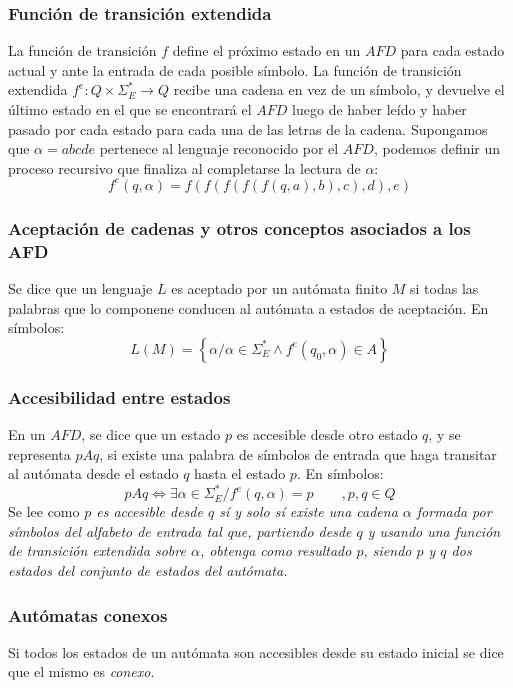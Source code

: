 \documentclass[12pt]{article}
\begin{document}
\subsubsection{Función de transición extendida}
La función de transición $ f $ define el próximo estado en un $ AFD $ para cada estado actual y ante la entrada de cada posible símbolo. La función de transición extendida $ f^{e}:Q\times \Sigma_{E}^{*} \to Q $ recibe una cadena en vez de un símbolo, y devuelve el último estado en el que se encontrará el $ AFD $ luego de haber leído y haber pasado por cada estado para cada una de las letras de la cadena. Supongamos que $ \alpha=abcde $ pertenece al lenguaje reconocido por el $ AFD $, podemos definir un proceso recursivo que finaliza al completarse la lectura de $ \alpha $:
\[
f^{e}(q,\alpha) = f(f(f(f(f(q,a),b),c),d),e)
\]

\subsubsection{Aceptación de cadenas y otros conceptos asociados a los AFD}
Se dice que un lenguaje $ L $ es aceptado por un autómata finito $ M $ si todas las palabras que lo componene conducen al autómata a estados de aceptación. En símbolos:
\[
L(M) = \left\{\alpha / \alpha \in \Sigma_{E}^{*} \land f^{e}(q_{0},\alpha) \in A\right\}
\]

\subsubsection{Accesibilidad entre estados}
En un $ AFD $, se dice que un estado $ p $ es accesible desde otro estado $ q $, y se representa $ pAq $, si existe una palabra de símbolos de entrada que haga transitar al autómata desde el estado $ q $ hasta el estado $ p $. En símbolos:
\[
pAq  \iff  \exists \alpha \in \Sigma_{E}^{*} / f^{e}(q,\alpha)=p\qquad ,p,q \in Q
\]
Se lee como \textit{$ p $ es accesible desde $ q $ sí y solo sí existe una cadena $ \alpha $ formada por símbolos del alfabeto de entrada tal que, partiendo desde $ q $ y usando una función de transición extendida sobre $ \alpha $, obtenga como resultado $ p $, siendo $ p $ y $ q $ dos estados del conjunto de estados del autómata.}

\subsubsection{Autómatas conexos}
Si todos los estados de un autómata son accesibles desde su estado inicial se dice que el mismo es \textit{conexo}.
\end{document}
